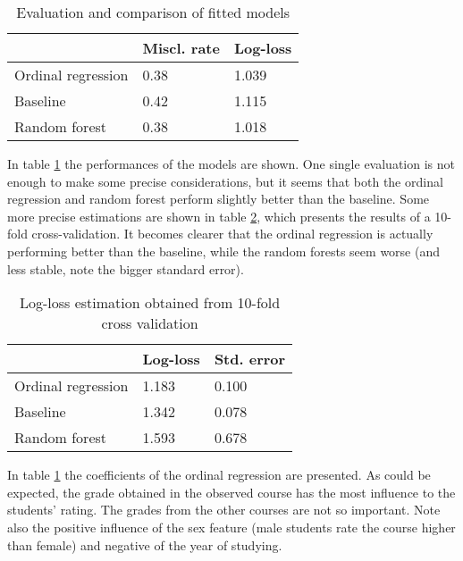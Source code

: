 \documentclass[twocolumn, 8pt]{article}
\begin{document}
\begin{table}[ht]
    \begin{tabular}{|l|l|l|} \hline
        & \textbf{Miscl. rate} & \textbf {Log-loss} \\ \hline
        Ordinal regression & 0.38 & 1.039 \\ \hline
        Baseline & 0.42 & 1.115 \\ \hline
        Random forest & 0.38 & 1.018 \\ \hline
    \end{tabular}
    \caption{Evaluation and comparison of fitted models}
    \label{tab:single}
\end{table}

In table \ref{tab:single} the performances of the models are shown. One single evaluation is not enough to make some precise considerations, but it seems that both the ordinal regression and random forest perform slightly better than the baseline. Some more precise estimations are shown in table \ref{tab:cv}, which presents the results of a 10-fold cross-validation. It becomes clearer that the ordinal regression is actually performing better than the baseline, while the random forests seem worse (and less stable, note the bigger standard error).

\begin{table}[ht]
    \begin{tabular}{|l|l|l|} \hline
        & \textbf{Log-loss} & \textbf{Std. error} \\ \hline
        Ordinal regression & 1.183 & 0.100 \\ \hline
        Baseline & 1.342 & 0.078 \\ \hline
        Random forest & 1.593 & 0.678 \\ \hline
    \end{tabular}
    \caption{Log-loss estimation obtained from 10-fold cross   validation}
    \label{tab:cv}
\end{table}

In table \ref{tab:single} the coefficients of the ordinal regression are presented. As could be expected, the grade obtained in the observed course has the most influence to the students' rating. The grades from the other courses are not so important. Note also the positive influence of the sex feature (male students rate the course higher than female) and negative of the year of studying. 
\end{document}
